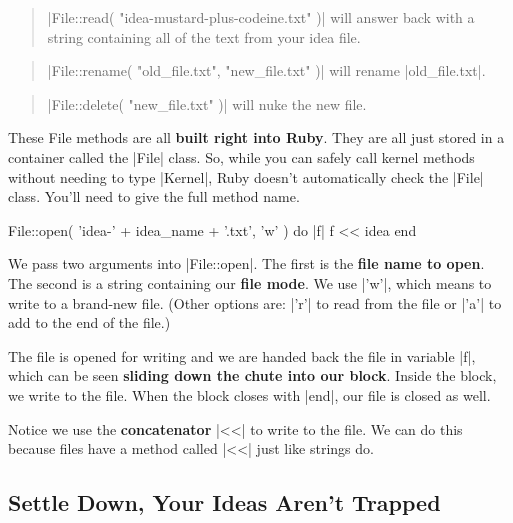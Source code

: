 \documentclass[12pt,twoside]{report}
\begin{document}
\begin{quote}
\rubyinline|File::read( "idea-mustard-plus-codeine.txt" )|
will answer back with a string containing all of the text from your
idea file.\end{quote}


\begin{quote}
\rubyinline|File::rename( "old_file.txt", "new_file.txt" )| 
will rename
\rubyinline|old_file.txt|.\end{quote}


\begin{quote}
\rubyinline|File::delete( "new_file.txt" )| will nuke
the new file.\end{quote}


These File methods are all {\bf built right into Ruby}.  They are all
just stored in a container called the
\rubyinline|File| class.  So, while you can safely
call kernel methods without needing to type
\rubyinline|Kernel|, Ruby doesn't automatically check
the \rubyinline|File| class. You'll need to give the
full method name.


\begin{rubycode}

 File::open( 'idea-' + idea_name + '.txt', 'w' ) do |f|
   f << idea
 end

\end{rubycode}

We pass two arguments into \rubyinline|File::open|.
The first is the {\bf file name to open}.  The second is a string
containing our {\bf file mode}.  We use
\rubyinline|'w'|, which means to write to a brand-new
file.  (Other options are: \rubyinline|'r'| to read
from the file or \rubyinline|'a'| to add to the end of
the file.)

The file is opened for writing and we are handed back the file in
variable \rubyinline|f|, which can be seen {\bf
  sliding down the chute into our block}.  Inside the block, we write
to the file.  When the block closes with
\rubyinline|end|, our file is closed as well.

Notice we use the {\bf concatenator} \rubyinline|<<|
to write to the file.  We can do this because files have a method
called \rubyinline|<<| just like strings do.



\subsection{Settle Down, Your Ideas Aren't Trapped}
\end{document}
